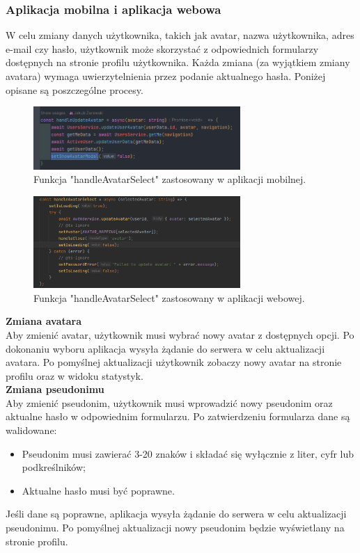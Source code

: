 \subsubsection{Aplikacja mobilna i aplikacja webowa}
W celu zmiany danych użytkownika, takich jak avatar, nazwa użytkownika, adres e-mail czy hasło, użytkownik może skorzystać z odpowiednich formularzy dostępnych na stronie profilu użytkownika. Każda zmiana (za wyjątkiem zmiany avatara) wymaga uwierzytelnienia przez podanie aktualnego hasła. Poniżej opisane są poszczególne procesy.

\begin{figure}[H]
    \centering
    \includegraphics[width=0.7\textwidth]{chapters/chapter_8/screens/edit_user_mobile}
    \caption{Funkcja "handleAvatarSelect" zastosowany w aplikacji mobilnej.}
    \label{img:edit_user_mobile}
\end{figure}

\begin{figure}[H]
    \centering
    \includegraphics[width=0.7\textwidth]{chapters/chapter_8/screens/edit_user_web}
    \caption{Funkcja "handleAvatarSelect" zastosowany w aplikacji webowej.}
    \label{img:edit_user_web}
\end{figure}

\textbf{Zmiana avatara}\\
Aby zmienić avatar, użytkownik musi wybrać nowy avatar z dostępnych opcji. Po dokonaniu wyboru aplikacja wysyła żądanie do serwera w celu aktualizacji avatara. Po pomyślnej aktualizacji użytkownik zobaczy nowy avatar na stronie profilu oraz w widoku statystyk.\\


\textbf{Zmiana pseudonimu}\\
Aby zmienić pseudonim, użytkownik musi wprowadzić nowy pseudonim oraz aktualne hasło w odpowiednim formularzu. Po zatwierdzeniu formularza dane są walidowane:
\begin{itemize}
    \item Pseudonim musi zawierać 3-20 znaków i składać się wyłącznie z liter, cyfr lub podkreślników;
    \item Aktualne hasło musi być poprawne.
\end{itemize}
Jeśli dane są poprawne, aplikacja wysyła żądanie do serwera w celu aktualizacji pseudonimu. Po pomyślnej aktualizacji nowy pseudonim będzie wyświetlany na stronie profilu.\\


